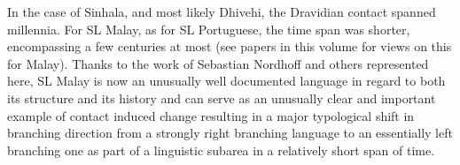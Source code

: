 \documentclass[letterpaper]{article}
\begin{document}
 In the case of Sinhala, and most likely Dhivehi, the Dravidian contact spanned millennia. For SL Malay, as for SL Portuguese, the time span was shorter, encompassing a few centuries at most (see papers in this volume for views on this for Malay). Thanks to the work of Sebastian Nordhoff and others represented here, SL Malay is now an unusually well documented language in regard to both its structure and its history and can serve as an unusually clear and important example of contact induced change resulting in a major typological shift in branching direction from a strongly right branching language to an essentially left branching one as part of a linguistic subarea in a relatively short span of time. 
\end{document}
